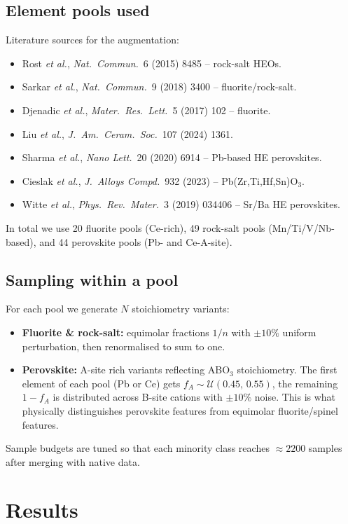 \documentclass[11pt]{article}
\begin{document}
\subsection{Element pools used}
Literature sources for the augmentation:
\begin{itemize}
  \item Rost \emph{et al.}, \emph{Nat.\ Commun.}~6 (2015) 8485 -- rock-salt HEOs.
  \item Sarkar \emph{et al.}, \emph{Nat.\ Commun.}~9 (2018) 3400 -- fluorite/rock-salt.
  \item Djenadic \emph{et al.}, \emph{Mater.\ Res.\ Lett.}~5 (2017) 102 -- fluorite.
  \item Liu \emph{et al.}, \emph{J.\ Am.\ Ceram.\ Soc.}~107 (2024) 1361.
  \item Sharma \emph{et al.}, \emph{Nano Lett.}~20 (2020) 6914 -- Pb-based HE perovskites.
  \item Cieslak \emph{et al.}, \emph{J.\ Alloys Compd.}~932 (2023) -- Pb(Zr,Ti,Hf,Sn)O$_3$.
  \item Witte \emph{et al.}, \emph{Phys.\ Rev.\ Mater.}~3 (2019) 034406 -- Sr/Ba HE perovskites.
\end{itemize}

In total we use 20 fluorite pools (Ce-rich), 49 rock-salt pools (Mn/Ti/V/Nb-
based), and 44 perovskite pools (Pb- and Ce-A-site).

\subsection{Sampling within a pool}
For each pool we generate $N$ stoichiometry variants:
\begin{itemize}
  \item \textbf{Fluorite \& rock-salt:} equimolar fractions $1/n$ with
        $\pm 10\%$ uniform perturbation, then renormalised to sum to one.
  \item \textbf{Perovskite:} A-site rich variants reflecting ABO$_3$
        stoichiometry. The first element of each pool (Pb or Ce) gets
        $f_A \sim \mathcal{U}(0.45,\,0.55)$, the remaining $1-f_A$ is
        distributed across B-site cations with $\pm 10\%$ noise. This is
        what physically distinguishes perovskite features from
        equimolar fluorite/spinel features.
\end{itemize}
Sample budgets are tuned so that each minority class reaches
$\approx 2200$ samples after merging with native data.

\section{Results}
\label{sec:results}
\end{document}

